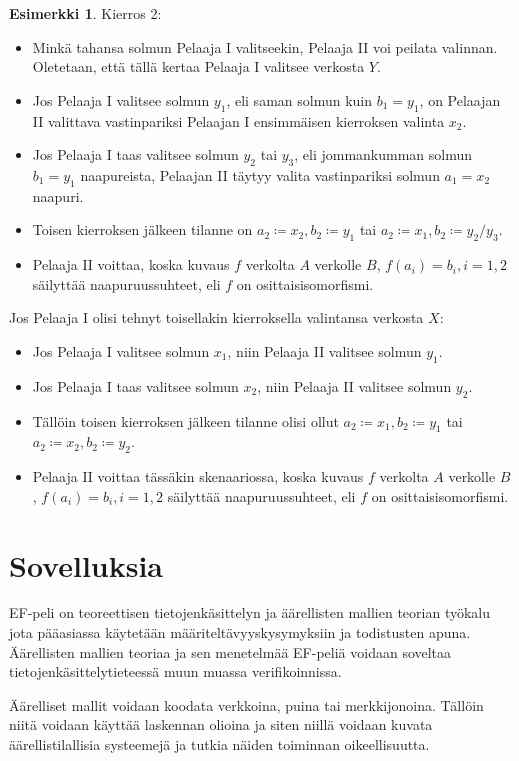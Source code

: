 \documentclass[finnish]{tktltiki2}
\theoremstyle{definition}
\newtheorem{esim}[lau]{Esimerkki}
\theoremstyle{remark}
\begin{document}
\begin{esim}
Kierros 2:
\begin{itemize}
  \item Minkä tahansa solmun Pelaaja I valitseekin, Pelaaja II voi peilata valinnan. Oletetaan, että tällä kertaa Pelaaja I valitsee verkosta $Y$.
  \item Jos Pelaaja I valitsee solmun $y_1$, eli saman solmun kuin $b_1 = y_1$, on Pelaajan II valittava vastinpariksi Pelaajan I ensimmäisen kierroksen valinta $x_2$.
  \item Jos Pelaaja I taas valitsee solmun $y_2$ tai $y_3$, eli jommankumman solmun $b_1 = y_1$ naapureista, Pelaajan II täytyy valita vastinpariksi solmun $a_1 = x_2$ naapuri.
  \item Toisen kierroksen jälkeen tilanne on $a_2 \coloneqq x_2, b_2 \coloneqq y_1$ tai $a_2 \coloneqq x_1, b_2 \coloneqq y_2/y_3$.
  \item Pelaaja II voittaa, koska kuvaus $f$ verkolta $A$ verkolle $B$, $f(a_i) = b_i, i = 1, 2$ säilyttää naapuruussuhteet, eli $f$ on osittaisisomorfismi.
\end{itemize}

Jos Pelaaja I olisi tehnyt toisellakin kierroksella valintansa verkosta $X$:
\begin{itemize}
\item Jos Pelaaja I valitsee solmun $x_1$, niin Pelaaja II valitsee solmun $y_1$.
\item Jos Pelaaja I taas valitsee solmun $x_2$, niin Pelaaja II valitsee solmun $y_2$.
\item Tällöin toisen kierroksen jälkeen tilanne olisi ollut $a_2 \coloneqq x_1, b_2 \coloneqq y_1$ tai $a_2 \coloneqq x_2, b_2 \coloneqq y_2$.
\item Pelaaja II voittaa tässäkin skenaariossa, koska kuvaus $f$ verkolta $A$ verkolle $B$, $f(a_i) = b_i, i = 1, 2$ säilyttää naapuruussuhteet, eli $f$ on osittaisisomorfismi.
\end{itemize}
\end{esim}

\section{Sovelluksia}
EF-peli on teoreettisen tietojenkäsittelyn ja äärellisten mallien teorian työkalu jota pääasiassa käytetään määriteltävyyskysymyksiin ja todistusten apuna. Äärellisten mallien teoriaa ja sen menetelmää EF-peliä voidaan soveltaa tietojenkäsittelytieteessä muun muassa verifikoinnissa.

Äärelliset mallit voidaan koodata verkkoina, puina tai merkkijonoina. Tällöin niitä voidaan käyttää laskennan olioina ja siten niillä voidaan kuvata äärellistilallisia systeemejä ja tutkia näiden toiminnan oikeellisuutta. 
\end{document}
